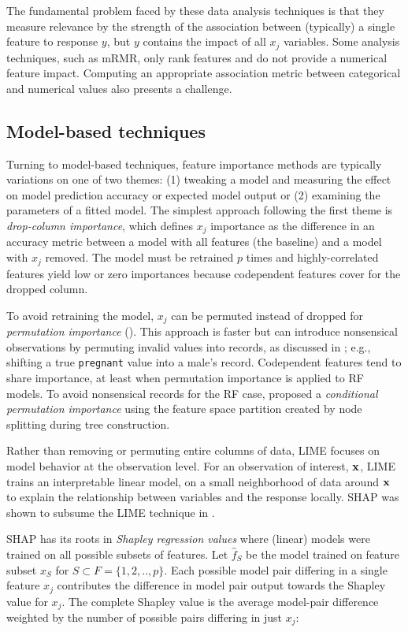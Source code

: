 \documentclass[11pt]{article}
\begin{document}
The fundamental problem faced by these data analysis techniques is that they measure relevance by the strength of the association between (typically) a single feature to response $y$, but $y$ contains the impact of all $x_j$ variables. Some analysis techniques, such as mRMR, only rank features and do not provide a numerical feature impact. Computing an appropriate association metric between categorical and numerical values also presents a challenge.

\subsection{Model-based techniques}

Turning to model-based techniques, feature importance methods are typically variations on one of two themes:  (1) tweaking a model and measuring the effect on model prediction accuracy or expected model output or (2) examining the parameters of a fitted model. The simplest approach following the first theme is {\em drop-column importance}, which defines $x_j$ importance as the difference in an accuracy metric between a model with all features (the baseline) and a model with $x_j$ removed. The model must be retrained $p$ times and highly-correlated features yield low or zero importances because codependent features cover for the dropped column.

To avoid retraining the model, $x_j$ can be permuted instead of dropped for {\em permutation importance} (\citealt{RF}). This approach is faster but can introduce nonsensical observations by permuting invalid values into records, as discussed in \cite{stopperm}; e.g., shifting a true {\tt\small pregnant} value into a male's record. Codependent features tend to share importance, at least when permutation importance is applied to RF models. To avoid nonsensical records for the RF case, \cite{rfimp} proposed a {\em conditional permutation importance} using the feature space partition created by node splitting during tree construction.  

Rather than removing or permuting entire columns of data, LIME \citep{lime} focuses on model behavior at the observation level. For an observation of interest, $\bf x$, LIME trains an interpretable linear model, on a small neighborhood of data around $\bf x$ to explain the relationship between variables and the response locally. SHAP was shown to subsume the LIME technique in \citep{shap}. 

SHAP has its roots in {\em Shapley regression values} \citep{shapley-regression} where (linear) models were trained on all possible subsets of features. Let $\hat{f}_S$ be the model trained on feature subset $x_S$ for $S \subset F = \{1, 2, .., p\}$. Each possible model pair differing in a single feature $x_j$ contributes the difference in model pair output towards the Shapley value for $x_j$. The complete Shapley value is the average model-pair difference weighted by the number of possible pairs differing in just $x_j$:
\vspace{-1mm}
\end{document}
